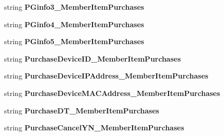 \begin{DoxyCompactItemize}
\item 
string {\bfseries P\+Ginfo3\+\_\+\+Member\+Item\+Purchases}\hypertarget{a00004_a48ee2b776cb208b6d6d296d15abb7bbd}{}\label{a00004_a48ee2b776cb208b6d6d296d15abb7bbd}

\item 
string {\bfseries P\+Ginfo4\+\_\+\+Member\+Item\+Purchases}\hypertarget{a00004_aa04a5bb041676f1d3b3b62a6ddc5930c}{}\label{a00004_aa04a5bb041676f1d3b3b62a6ddc5930c}

\item 
string {\bfseries P\+Ginfo5\+\_\+\+Member\+Item\+Purchases}\hypertarget{a00004_a618a8dda88ce7e8ec7cb2c748782b4c9}{}\label{a00004_a618a8dda88ce7e8ec7cb2c748782b4c9}

\item 
string {\bfseries Purchase\+Device\+I\+D\+\_\+\+Member\+Item\+Purchases}\hypertarget{a00004_a8f34e1a94cee5b777ad679de1c6dce82}{}\label{a00004_a8f34e1a94cee5b777ad679de1c6dce82}

\item 
string {\bfseries Purchase\+Device\+I\+P\+Address\+\_\+\+Member\+Item\+Purchases}\hypertarget{a00004_afb2768cb683df51cd4d96cac93d4bd2e}{}\label{a00004_afb2768cb683df51cd4d96cac93d4bd2e}

\item 
string {\bfseries Purchase\+Device\+M\+A\+C\+Address\+\_\+\+Member\+Item\+Purchases}\hypertarget{a00004_acf261344bbf6f05334ff0bf563c9385f}{}\label{a00004_acf261344bbf6f05334ff0bf563c9385f}

\item 
string {\bfseries Purchase\+D\+T\+\_\+\+Member\+Item\+Purchases}\hypertarget{a00004_a1c3d7c203e9fb34a596582cfe847fba2}{}\label{a00004_a1c3d7c203e9fb34a596582cfe847fba2}

\item 
string {\bfseries Purchase\+Cancel\+Y\+N\+\_\+\+Member\+Item\+Purchases}\hypertarget{a00004_aada2c6ebc173391aaf83d160f8012bcb}{}\label{a00004_aada2c6ebc173391aaf83d160f8012bcb}


\end{DoxyCompactItemize}
